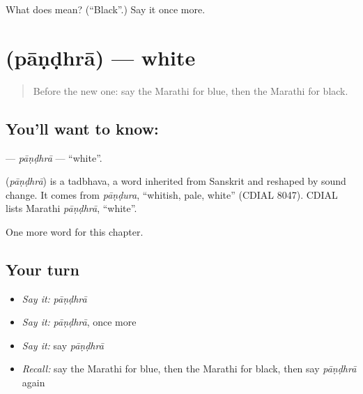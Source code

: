 \begin{tcolorbox}[breakable,colback=teal!4,colframe=teal!35!black,title={Before you move on}]
What does  mean? (\textquotedblleft{}Black\textquotedblright{}.) Say it once more.
\end{tcolorbox}
\section[\texorpdfstring{\mr{पांढरा} (pāṇḍhrā)}{पांढरा (pāṇḍhrā)}]{ (pāṇḍhrā) — white}

\label{lesson:MR-C108-pandhra}



\begin{quote}
Before the new one: say the Marathi for blue, then the Marathi for black.
\end{quote}

\subsection*{You'll want to know: }
\textbf{} — \emph{pāṇḍhrā} — \textquotedblleft{}white\textquotedblright{}.

\begin{cousinweb}
\textbf{} (\emph{pāṇḍhrā}) is a tadbhava, a word inherited from Sanskrit and reshaped by sound change. It comes from \emph{pāṇḍura}, \textquotedblleft{}whitish, pale, white\textquotedblright{} (CDIAL 8047). CDIAL lists Marathi \emph{pāṇḍhrā}, \textquotedblleft{}white\textquotedblright{}.
\end{cousinweb}

\begin{grammarlens}[title={What you've built}]
One more word for this chapter.
\end{grammarlens}

\subsection*{Your turn}
\begin{itemize}
\raggedright
  \item \emph{Say it:} \emph{pāṇḍhrā}
  \item \emph{Say it:} \emph{pāṇḍhrā}, once more
  \item \emph{Say it:} say \emph{pāṇḍhrā}
  \item \emph{Recall:} say the Marathi for blue, then the Marathi for black, then say \emph{pāṇḍhrā} again
\end{itemize}

